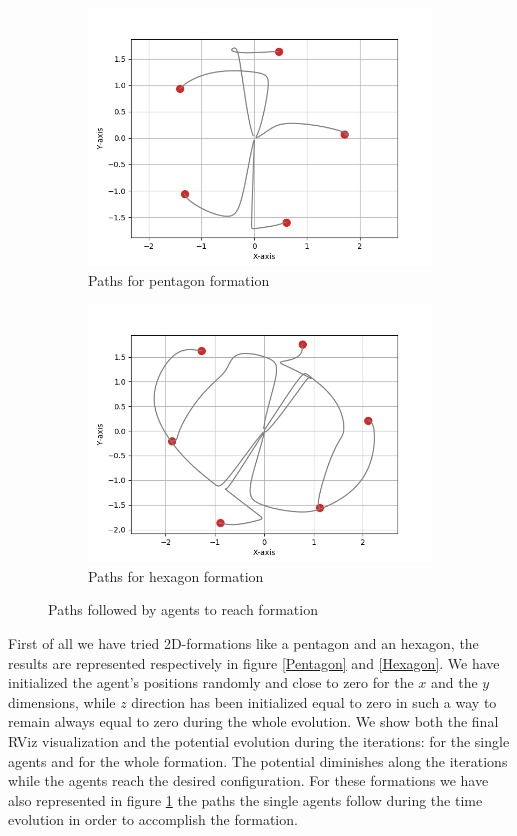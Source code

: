 \documentclass[a4paper,11pt,oneside]{book}
\begin{document}
\begin{figure}
\centering
	\begin{subfigure}{0.48\textwidth}	
	\includegraphics[scale=0.43]{Pentagon_path}
	\caption{Paths for pentagon formation}
	\end{subfigure}
\hfill
	\begin{subfigure}{0.48\textwidth}	
	\includegraphics[scale=0.43]{Hexagon_path}
	\caption{Paths for hexagon formation}
	\end{subfigure}
\caption{Paths followed by agents to reach formation}
\label{Paths}
\end{figure}

First of all we have tried 2D-formations like a pentagon and an hexagon, the results are represented respectively in figure \ref{Pentagon} and \ref{Hexagon}. We have initialized the agent's positions randomly and close to zero for the $x$ and the $y$ dimensions, while $z$ direction has been initialized equal to zero in such a way to remain always equal to zero during the whole evolution.
We show both the final RViz visualization and the potential evolution during the iterations: for the single agents and for the whole formation. The potential diminishes along the iterations while the agents reach the desired configuration. 
For these formations we have also represented in figure \ref{Paths} the paths the single agents follow during the time evolution in order to accomplish the formation.
\end{document}
